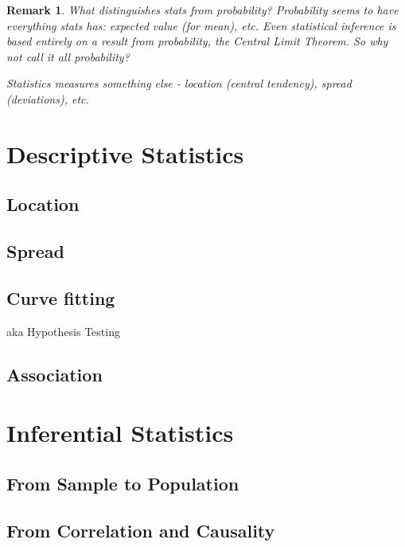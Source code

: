 \documentclass[reqno,12pt]{tufte-book}
\numberwithin{equation}{subsection}
\newtheorem{remark}{Remark}
\begin{document}
\begin{remark}
  What distinguishes stats from probability?  Probability seems to
  have everything stats has: expected value (for mean), etc.  Even
  statistical inference is based entirely on a result from
  probability, the Central Limit Theorem.  So why not call it all
  probability?

Statistics measures something else
  - location (central tendency), spread (deviations), etc.
\end{remark}

\chapter{Descriptive Statistics}

\section{Location}

\section{Spread}

\section{Curve fitting}

aka Hypothesis Testing

\section{Association}

\chapter{Inferential Statistics}

\section{From Sample to Population}

\section{From Correlation and Causality}
\end{document}
